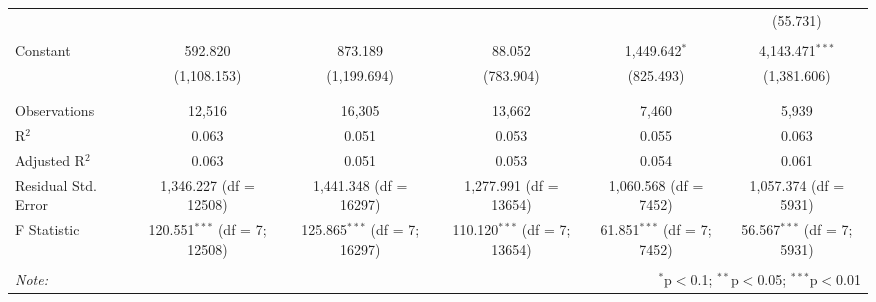 \begin{table}[!htbp]
\begin{tabular}{@{\extracolsep{5pt}}lccccc}
  &  &  &  &  & (55.731) \\ 
  & & & & & \\ 
 Constant & 592.820 & 873.189 & 88.052 & 1,449.642$^{*}$ & 4,143.471$^{***}$ \\ 
  & (1,108.153) & (1,199.694) & (783.904) & (825.493) & (1,381.606) \\ 
  & & & & & \\ 
\hline \\[-1.8ex] 
Observations & 12,516 & 16,305 & 13,662 & 7,460 & 5,939 \\ 
R$^{2}$ & 0.063 & 0.051 & 0.053 & 0.055 & 0.063 \\ 
Adjusted R$^{2}$ & 0.063 & 0.051 & 0.053 & 0.054 & 0.061 \\ 
Residual Std. Error & 1,346.227 (df = 12508) & 1,441.348 (df = 16297) & 1,277.991 (df = 13654) & 1,060.568 (df = 7452) & 1,057.374 (df = 5931) \\ 
F Statistic & 120.551$^{***}$ (df = 7; 12508) & 125.865$^{***}$ (df = 7; 16297) & 110.120$^{***}$ (df = 7; 13654) & 61.851$^{***}$ (df = 7; 7452) & 56.567$^{***}$ (df = 7; 5931) \\ 
\hline 
\hline \\[-1.8ex] 
\textit{Note:}  & \multicolumn{5}{r}{$^{*}$p$<$0.1; $^{**}$p$<$0.05; $^{***}$p$<$0.01} \\ 
\end{tabular} 
\end{table} 
